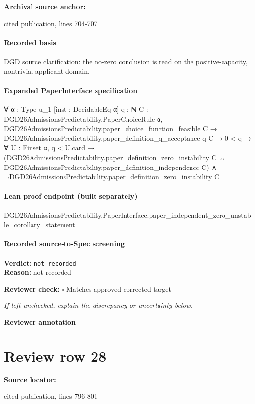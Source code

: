 \documentclass[10pt]{article}
\newcommand{\reviewerbox}{%
  \par\noindent\fbox{\parbox{0.96\linewidth}{\rule{0pt}{0.38in}}}\par
}
\newcommand{\reviewmatch}[1]{%
  \par\noindent\textbf{Reviewer check:} $\square$\; #1\par
  \noindent\emph{If left unchecked, explain the discrepancy or uncertainty below.}\par
}
\begin{document}
\textbf{Archival source anchor:} {\footnotesize\raggedright cited publication, lines 704-\allowbreak{}707\par}
\paragraph{Recorded basis}
DGD source clarification:\allowbreak{} the no-\allowbreak{}zero conclusion is read on the positive-\allowbreak{}capacity, nontrivial applicant domain.\allowbreak{}
\paragraph{Expanded PaperInterface specification}
\begin{ReviewVerbatim}
∀ {α : Type u_1} [inst : DecidableEq α] {q : ℕ} {C : DGD26AdmissionsPredictability.PaperChoiceRule α},
  DGD26AdmissionsPredictability.paper_choice_function_feasible C →
    DGD26AdmissionsPredictability.paper_definition_q_acceptance q C →
      0 < q →
        ∀ {U : Finset α},
          q < U.card →
            (DGD26AdmissionsPredictability.paper_definition_zero_instability C ↔
                DGD26AdmissionsPredictability.paper_definition_independence C) ∧
              ¬DGD26AdmissionsPredictability.paper_definition_zero_instability C
\end{ReviewVerbatim}

\paragraph{Lean proof endpoint (built separately)}\begin{ReviewVerbatim}
DGD26AdmissionsPredictability.PaperInterface.paper_independent_zero_unstable_corollary_statement
\end{ReviewVerbatim}

\paragraph{Recorded source-to-Spec screening}
\textbf{Verdict:} \texttt{not recorded}
\\
\textbf{Reason:} not recorded
\reviewmatch{Matches approved corrected target}
\noindent\textbf{Reviewer annotation}\par
\reviewerbox
\clearpage
\hypertarget{source-claim-18a641b7c4365d27}{}
\section*{Review row 28}
\textbf{Source locator:} {\footnotesize\raggedright cited publication, lines 796-\allowbreak{}801\par}
\end{document}
